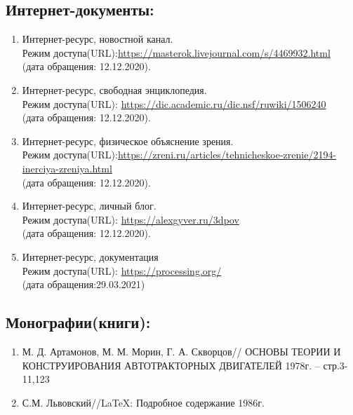 \documentclass[a4paper, 12pt]{article}
\renewcommand{\href}[1]{\url{#1}}
\begin{document}
\subsection{Интернет-документы:}
\begin{enumerate}
  \item Интернет-ресурс, новостной канал. \\
        Режим доступа(URL):\href{https://masterok.livejournal.com/s/4469932.html} \\
        (дата обращения: 12.12.2020).
  \item Интернет-ресурс, свободная энциклопедия. \\
        Режим доступа(URL): \href{https://dic.academic.ru/dic.nsf/ruwiki/1506240}\\
        (дата обращения: 12.12.2020).
  \item Интернет-ресурс, физическое объяснение зрения. \\
        Режим доступа(URL):\href{https://zreni.ru/articles/tehnicheskoe-zrenie/2194-inerciya-zreniya.html} \\
        (дата обращения: 12.12.2020).
  \item Интернет-ресурс, личный блог. \\
        Режим доступа(URL): \href{https://alexgyver.ru/3dpov} \\
        (дата обращения: 12.12.2020).
  \item Интернет-ресурс, документация\\
        Режим доступа(URL): \href{https://processing.org/}\\
        (дата обращения:29.03.2021)
\end{enumerate}
\subsection{Монографии(книги):}
\begin{enumerate}
  \item М. Д. Артамонов, М. М. Морин, Г. А. Скворцов// ОСНОВЫ ТЕОРИИ И КОНСТРУИРОВАНИЯ АВТОТРАКТОРНЫХ ДВИГАТЕЛЕЙ 1978г. -- стр.3-11,123 \item С.М. Львовский//LaTeX: Подробное содержание 1986г.
\end{enumerate}
\end{document}
